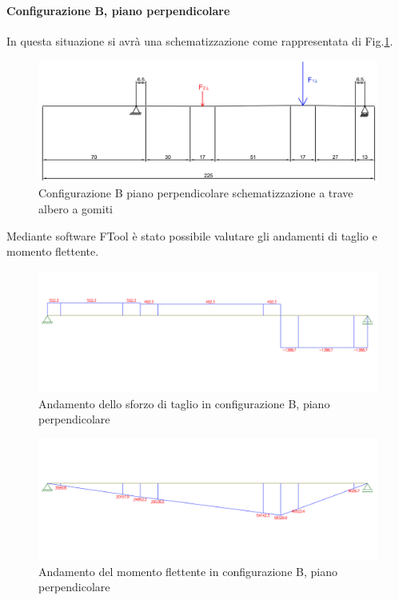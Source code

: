 \paragraph{Configurazione B, piano perpendicolare}
In questa situazione si avrà una schematizzazione come rappresentata di Fig.\ref{fig:SchemaAlberoBPerp}.
\begin{figure}[h]
    \centering
    \includegraphics[scale=0.5]{Immagini/SchemaAlberoBPerp.png}
    \caption{Configurazione B piano perpendicolare schematizzazione a trave albero a gomiti}
    \label{fig:SchemaAlberoBPerp}
\end{figure}

Mediante software FTool è stato possibile valutare gli andamenti di taglio e momento flettente. 
\begin{figure}[h]
    \centering
    \includegraphics[scale=0.5]{Immagini/AndamentoTaglioBAlberoPerp.png}
    \caption{Andamento dello sforzo di taglio in configurazione B, piano perpendicolare}
    \label{fig:AndamentoTalioBAlberoPerp}
\end{figure}
\newpage
\begin{figure}[h]
    \centering
    \includegraphics[scale=0.5]{Immagini/AndamentoMomentoBAlberoPerp.png}
    \caption{Andamento del momento flettente in configurazione B, piano perpendicolare}
    \label{fig:AndamentoMomentoBAlberoPerp}
\end{figure}
